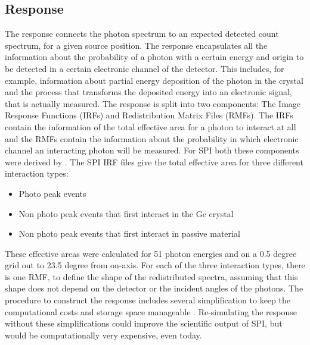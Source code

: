 \documentclass[twocolumn]{aa}
\begin{document}
\subsection{Response}
\label{response}

The response connects the photon spectrum to an expected detected count spectrum, for a given source position. The response encapsulates all the information about the probability of a photon with a certain energy and origin to be detected in a certain electronic channel of the detector. This includes, for example, information about partial energy deposition of the photon in the crystal and the process that transforms the deposited energy into an electronic signal, that is actually measured.
The response is split into two components: The Image Response Functions (IRFs) and Redistribution Matrix Files (RMFs). The IRFs contain the information of the total effective area for a photon to interact at all and the RMFs contain the information about the probability in which electronic channel an interacting photon will be measured. For SPI both these components were derived by \citet{spi_response}.
The SPI IRF files give the total effective area for three different interaction types:
\begin{itemize}
  \item Photo peak events
  \item Non photo peak events that first interact in the Ge crystal
  \item Non photo peak events that first interact in passive material
\end{itemize}
\noindent
These effective areas were calculated for 51 photon energies and on a 0.5 degree grid out to 23.5 degree from on-axis. For each of the three interaction types, there is one RMF, to define the shape of the redistributed spectra, assuming that this shape does not depend on the detector or the incident angles of the photons. The procedure to construct the response includes several simplification to keep the computational costs and storage space manageable \citep{spi_response}. Re-simulating the response without these simplifications could improve the scientific output of SPI, but would be computationally very expensive, even today.
\end{document}
